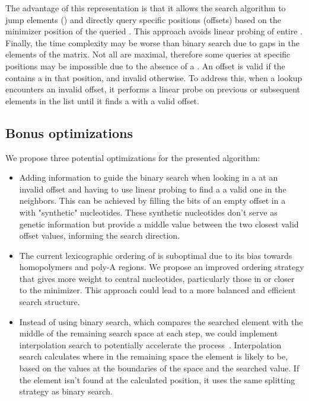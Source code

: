 The advantage of this \skmer representation is that it allows the search algorithm to jump elements (\skmers) and directly query specific positions (offsets) based on the minimizer position of the queried \kmer. This approach avoids linear probing of entire \skmers.\\
Finally, the time complexity may be worse than binary search due to gaps in the elements of the matrix. Not all \skmers are maximal, therefore some queries at specific positions may be impossible due to the absence of a \kmer. An offset is valid if the \skmer contains a \kmer in that position, and invalid otherwise. To address this, when a lookup encounters an invalid offset, it performs a linear probe on previous or subsequent elements in the list until it finds a \skmer with a valid offset.

\subsection{Bonus optimizations}
We propose three potential optimizations for the presented algorithm:
\begin{itemize}
	\item Adding information to guide the binary search when looking in a \skmer at an invalid offset and having to use linear probing to find a a valid one in the neighbors. This can be achieved by filling the bits of an empty offset in a \skmer with "synthetic" nucleotides. These synthetic nucleotides don't serve as genetic information but provide a middle value between the two closest valid offset values, informing the search direction.
	\item The current lexicographic ordering of \skmers is suboptimal due to its bias towards homopolymers and poly-A regions. We propose an improved ordering strategy that gives more weight to central nucleotides, particularly those in or closer to the minimizer. This approach could lead to a more balanced and efficient search structure.
	\item Instead of using binary search, which compares the searched element with the middle of the remaining search space at each step, we could implement interpolation search to potentially accelerate the process~\cite{pla_complexity}. Interpolation search calculates where in the remaining space the element is likely to be, based on the values at the boundaries of the space and the searched value. If the element isn't found at the calculated position, it uses the same splitting strategy as binary search.
\end{itemize}

